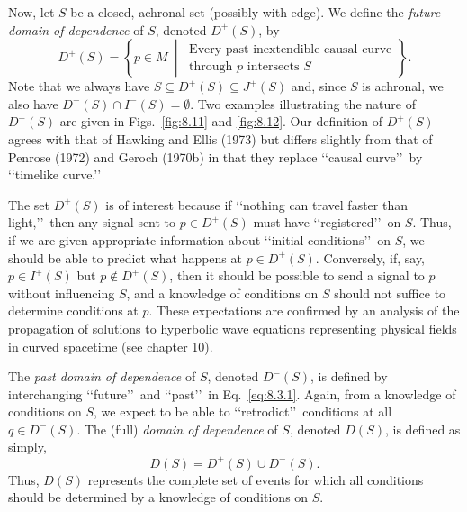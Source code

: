 Now, let \(S\) be a closed, achronal set (possibly with edge). We define the
\emph{future domain of dependence} of \(S\), denoted \(D^+(S)\), by
\begin{equation}
  D^+(S)=\left\{p\in M\ \middle|\
  \begin{gathered}
    \text{Every past inextendible causal curve}\\
    \text{through }p\text{ intersects }S
  \end{gathered}\right\}.
  \tag{8.3.1}\label{eq:8.3.1}
\end{equation}
Note that we always have \(S\subseteq D^+(S)\subseteq J^+(S)\) and, since \(S\)
is achronal, we also have \(D^+(S)\cap I^-(S)=\emptyset\). Two examples
illustrating the nature of \(D^+(S)\) are given in Figs.~\ref{fig:8.11} and
\ref{fig:8.12}. Our definition of \(D^+(S)\) agrees with that of Hawking and Ellis
(1973) but differs slightly from that of Penrose (1972) and Geroch (1970b) in that
they replace \lq\lq causal curve\rq\rq\ by \lq\lq timelike curve.\rq\rq

The set \(D^+(S)\) is of interest because if \lq\lq nothing can travel faster than light,\rq\rq\
then any signal sent to \(p\in D^+(S)\) must have \lq\lq registered\rq\rq\ on \(S\). Thus,
if we are given appropriate information about \lq\lq initial conditions\rq\rq\ on \(S\), we
should be able to predict what happens at \(p\in D^+(S)\). Conversely, if, say,
\(p\in I^+(S)\) but \(p\notin D^+(S)\), then it should be possible to send a signal
to \(p\) without influencing \(S\), and a knowledge of conditions on \(S\) should not
suffice to determine conditions at \(p\). These expectations are confirmed by an
analysis of the propagation of solutions to hyperbolic wave equations representing
physical fields in curved spacetime (see chapter 10).



The \emph{past domain of dependence} of \(S\), denoted \(D^-(S)\), is defined by
interchanging \lq\lq future\rq\rq\ and \lq\lq past\rq\rq\ in Eq.~\eqref{eq:8.3.1}. Again, from
a knowledge of conditions on \(S\), we expect to be able to \lq\lq retrodict\rq\rq\
conditions at all \(q\in D^-(S)\). The (full) \emph{domain of dependence} of \(S\),
denoted \(D(S)\), is defined as simply,
\begin{equation}
  D(S)=D^+(S)\cup D^-(S).
  \tag{8.3.2}\label{eq:8.3.2}
\end{equation}
Thus, \(D(S)\) represents the complete set of events for which all conditions should
be determined by a knowledge of conditions on \(S\).


